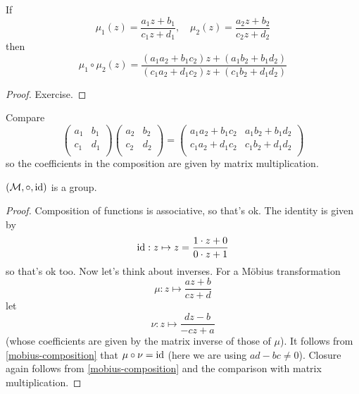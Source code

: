 \documentclass{../../template/note}
\begin{document}
    \begin{proposition}
        If
        \[
            \mu_1(z) = \frac{a_1 z + b_1}{c_1 z + d_1}, \quad \mu_2(z) = \frac{a_2 z + b_2}{c_2 z + d_2}
        \]
        then
        \[
            \mu_1 \circ \mu_2 (z) = \frac{(a_1a_2 + b_1c_2)z + (a_1b_2 + b_1d_2)}{(c_1a_2 + d_1c_2)z + (c_1b_2 + d_1d_2)}
        \]
        \label{mobius-composition}
    \end{proposition}

    \begin{proof}
        Exercise.
    \end{proof}    
    
    \begin{remark*}
        Compare
        \[
            \begin{pmatrix}
             a_1 & b_1 \\
             c_1 & d_1 \\
            \end{pmatrix}\begin{pmatrix}
             a_2 & b_2 \\
             c_2 & d_2 \\
            \end{pmatrix} = \begin{pmatrix}
             a_1a_2 + b_1c_2 & a_1b_2 + b_1d_2 \\
             c_1a_2 + d_1c_2 & c_1b_2 + d_1d_2 \\
            \end{pmatrix}
        \]
        so the coefficients in the composition are given by matrix multiplication.
    \end{remark*}

    \begin{theorem}
        \((\mathcal M, \circ, \operatorname{id})\) is a group.
    \end{theorem}
    
    \begin{proof}
        Composition of functions is associative, so that's ok. The identity is given by
        \[
            \operatorname{id}: z \mapsto z = \frac{1 \cdot z + 0}{0 \cdot z + 1}
        \]
        so that's ok too. Now let's think about inverses. For a M\"obius transformation
        \[
            \mu: z \mapsto \frac{az+b}{cz+d}
        \]
        let
        \[
            \nu: z \mapsto \frac{dz-b}{-cz+a}
        \]
        (whose coefficients are given by the matrix inverse of those of \(\mu\)). It follows from \cref{mobius-composition} that \(\mu \circ \nu = \operatorname{id}\) (here we are using \(ad - bc \neq 0\)). Closure again follows from \cref{mobius-composition} and the comparison with matrix multiplication.
    \end{proof}
    
\end{document}
